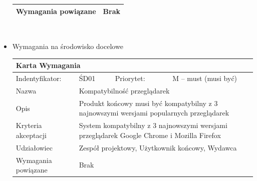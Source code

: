 \documentclass[a4paper,11pt]{report}
\begin{document}
\begin{itemize}
\begin{tabular}{|p{3cm}|p{2cm}|p{2cm}|p{6cm}|}
		\hline
		Wymagania powiązane & \multicolumn{3}{|p{10 cm}|}{Brak}\\
		\hline
		\end{tabular}\\
	\item Wymagania na środowisko docelowe\\
	\begin{tabular}{|p{3cm}|p{2cm}|p{2cm}|p{6cm}|}
		\hline
		\multicolumn{4}{|p{12 cm}|}{Karta Wymagania}\\
		\hline
		Indentyfikator: & ŚD01 & Priorytet: & M – must (musi być)\\
		\hline
		Nazwa & \multicolumn{3}{|p{10 cm}|}{Kompatybilność przeglądarek}\\
		\hline
		Opis & \multicolumn{3}{|p{10 cm}|}{Produkt końcowy musi być kompatybilny z 3 najnowszymi wersjami popularnych przeglądarek}\\
		\hline
		Kryteria akceptacji & \multicolumn{3}{|p{10 cm}|}{System kompatybilny z 3 najnowszymi wersjami przeglądarek Google Chrome i Mozilla Firefox}\\
		\hline
		Udziałowiec & \multicolumn{3}{|p{10 cm}|}{Zespół projektowy, Użytkownik końcowy, Wydawca}\\
		\hline
		Wymagania powiązane & \multicolumn{3}{|p{10 cm}|}{Brak}\\
		\hline
		\end{tabular}\\
\end{itemize}

 

\end{document}
